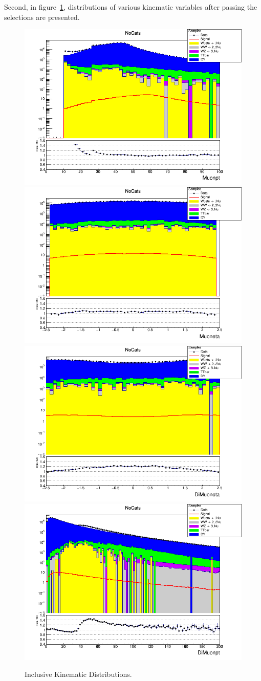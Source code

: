 Second, in figure~\ref{fig:higgs_selections_inclusivekinematic}, distributions of various kinematic variables after passing the selections are presented.
\begin{figure}[htbp]
  \centering
  \includegraphics[width=0.45\linewidth]{figures/ch_higgs/distributions/baseline_kalman/distribution__NoCats__Muonpt__logY.png}
  \includegraphics[width=0.45\linewidth]{figures/ch_higgs/distributions/baseline_kalman/distribution__NoCats__Muoneta__logY.png}\\
  \includegraphics[width=0.45\linewidth]{figures/ch_higgs/distributions/baseline_kalman/distribution__NoCats__DiMuoneta__logY.png}
  \includegraphics[width=0.45\linewidth]{figures/ch_higgs/distributions/baseline_kalman/distribution__NoCats__DiMuonpt__logY.png}
  \caption{Inclusive Kinematic Distributions.}
  \label{fig:higgs_selections_inclusivekinematic}
\end{figure}

